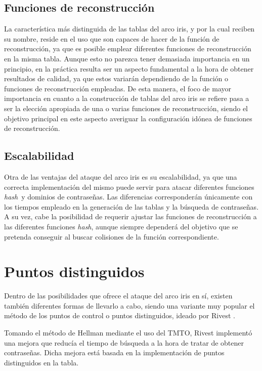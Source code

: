 \documentclass[12pt,spanish,listoffigures,listoftables]{tfgetsinf}
\newcommand{\hash}{\textit{hash}}
\begin{document}
\subsection{Funciones de reconstrucción}

La característica más distinguida de las tablas del arco iris, y por la cual reciben su nombre, reside en el uso que son capaces de hacer de la función de reconstrucción, ya que es posible emplear diferentes funciones de reconstrucción en la misma tabla. Aunque esto no parezca tener demasiada importancia en un principio, en la práctica resulta ser un aspecto fundamental a la hora de obtener resultados de calidad, ya que estos variarán dependiendo de la función o funciones de reconstrucción empleadas. De esta manera, el foco de mayor importancia en cuanto a la construcción de tablas del arco iris se refiere pasa a ser la elección apropiada de una o varias funciones de reconstrucción, siendo el objetivo principal en este aspecto averiguar la configuración idónea de funciones de reconstrucción. 

\subsection{Escalabilidad}

Otra de las ventajas del ataque del arco iris es su escalabilidad, ya que una correcta implementación del mismo puede servir para atacar diferentes funciones \hash~y dominios de contraseñas. Las diferencias corresponderán únicamente con los tiempos empleado en la generación de las tablas y la búsqueda de contraseñas. A su vez, cabe la posibilidad de requerir ajustar las funciones de reconstrucción a las diferentes funciones \hash, aunque siempre dependerá del objetivo que se pretenda conseguir al buscar colisiones de la función correspondiente.

\section{Puntos distinguidos}

Dentro de las posibilidades que ofrece el ataque del arco iris en sí, existen también diferentes formas de llevarlo a cabo, siendo una variante muy popular el método de los puntos de control o puntos distinguidos, ideado por Rivest \cite{rivest}.

Tomando el método de Hellman \cite{hellman} mediante el uso del TMTO, Rivest implementó una mejora que reducía el tiempo de búsqueda a la hora de tratar de obtener contraseñas. Dicha mejora está basada en la implementación de puntos distinguidos en la tabla.
\end{document}
